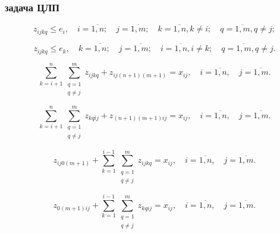 \begin{frame}
    \frametitle{задача ЦЛП}
    
    \begin{minipage}[t]{0.99\linewidth}
        \fontsize{8 pt}{7.2}\selectfont
        \begin{equation}
            \label{eq:part3_z_ijkq_1}
            z_{ijkq} \leq e_i , \quad i = \overline{1, n}; \quad j = \overline{1, m}; \quad k = \overline{1,n}, k \neq i; \quad q = \overline{1,m}, q \neq j;
        \end{equation}
        
        
        \begin{equation}
            \label{eq:part3_z_ijkq_2}
            z_{ijkq} \leq e_k , \quad k = \overline{1, n}; \quad j = \overline{1, m}; \quad i = \overline{1,n}, i \neq k; \quad q = \overline{1,m}, q \neq j.
        \end{equation}
        
        
        \begin{equation}
            \label{eq:part3_z_ijkq_3_1}
            \sum\limits_{k=i+1}^{n} \sum\limits_{\substack{q = 1\\ q \neq j}}^m z_{ijkq} + z_{ij(n+1)(m+1)} = x_{ij} ,  \quad i = \overline{1, n}, \quad j = \overline{1, m}.
        \end{equation}

        \begin{equation}
            \label{eq:part3_z_ijkq_1_2}
            \sum\limits_{k=i+1}^{n} \sum\limits_{\substack{q = 1\\ q \neq j}}^m z_{kqij} + z_{(n+1)(m+1)ij} = x_{ij} ,  \quad i = \overline{1, n}, \quad j = \overline{1, m}.
        \end{equation}

        \begin{equation}
            \label{eq:part3_z_ijkq_2_1}
            z_{ij0(m+1)} + \sum\limits_{k=1}^{i-1} \sum\limits_{\substack{q = 1\\ q \neq j}}^m z_{ijkq}= x_{ij}, \quad i = \overline{1, n}, \quad j = \overline{1, m}.
          \end{equation}
      
          
        \begin{equation}
        \label{eq:part3_z_ijkq_2_2}
            z_{0(m+1)ij} +  \sum\limits_{k=1}^{i-1} \sum\limits_{\substack{q = 1 \\ q \neq j}}^m z_{kqij}= x_{ij},  \quad i = \overline{1, n}, \quad j = \overline{1, m}.
        \end{equation}

     
    \end{minipage}

\end{frame}


